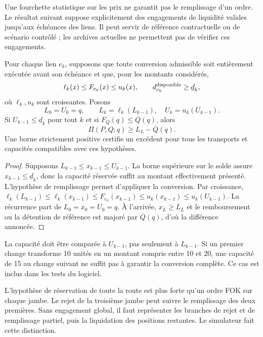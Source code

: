 Une fourchette statistique sur les prix ne garantit pas le remplissage d'un ordre. Le résultat suivant suppose explicitement des engagements de liquidité valides jusqu'aux échéances des liens. Il peut servir de référence contractuelle ou de scénario contrôlé ; les archives actuelles ne permettent pas de vérifier ces engagements.

\begin{proposition}
Pour chaque lien \(e_k\), supposons que toute conversion admissible soit entièrement exécutée avant son échéance et que, pour les montants considérés,
\[
 \ell_k(x)\le F_{e_k}(x)\le u_k(x),\qquad
 d_{e_k}^{\rm disponible}\ge \underline d_k,
\]
où \(\ell_k,u_k\) sont croissantes. Posons
\begin{equation}
 L_0=U_0=q,\qquad L_k=\ell_k(L_{k-1}),\quad U_k=u_k(U_{k-1}).
 \label{eq:ext-interval-propagation}
\end{equation}
Si \(U_{k-1}\le\underline d_k\) pour tout \(k\) et si \(F_Q(q)\le\overline Q(q)\), alors
\begin{equation}
 \Pi(P,Q;q)\ge L_L-\overline Q(q).
 \label{eq:ext-reserved}
\end{equation}
Une borne strictement positive certifie un excédent pour tous les transports et capacités compatibles avec ces hypothèses.
\end{proposition}
\begin{proof}
Supposons \(L_{k-1}\le x_{k-1}\le U_{k-1}\). La borne supérieure sur le solde assure \(x_{k-1}\le\underline d_k\), donc la capacité réservée suffit au montant effectivement présenté. L'hypothèse de remplissage permet d'appliquer la conversion. Par croissance,
\(\ell_k(L_{k-1})\le\ell_k(x_{k-1})\le F_{e_k}(x_{k-1})\le u_k(x_{k-1})\le u_k(U_{k-1})\).
La récurrence part de \(L_0=x_0=U_0=q\). À l'arrivée, \(x_L\ge L_L\) et le remboursement ou la détention de référence est majoré par \(\overline Q(q)\), d'où la différence annoncée.
\end{proof}

La capacité doit être comparée à \(U_{k-1}\), pas seulement à \(L_{k-1}\). Si un premier change transforme 10 unités en un montant compris entre 10 et 20, une capacité de 15 au change suivant ne suffit pas à garantir la conversion complète. Ce cas est inclus dans les tests du logiciel.

L'hypothèse de réservation de toute la route est plus forte qu'un ordre FOK sur chaque jambe. Le rejet de la troisième jambe peut suivre le remplissage des deux premières. Sans engagement global, il faut représenter les branches de rejet et de remplissage partiel, puis la liquidation des positions restantes. Le simulateur fait cette distinction.

